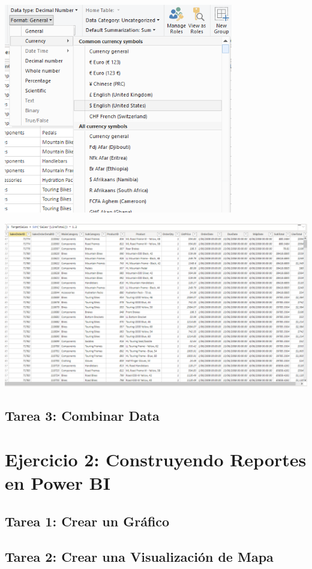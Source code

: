 \documentclass[12pt,letterpaper]{article}
\begin{document}
\begin{center}
\includegraphics[width=10cm]{images/222}\newline
\end{center}
\begin{center}
\includegraphics[width=16cm]{images/333}\newline
\end{center}
\subsection{Tarea 3: Combinar Data}
\section{Ejercicio 2: Construyendo Reportes en Power BI} 
\subsection{Tarea 1: Crear un Gráfico}
\subsection{Tarea 2: Crear una Visualización de Mapa}
\end{document}
